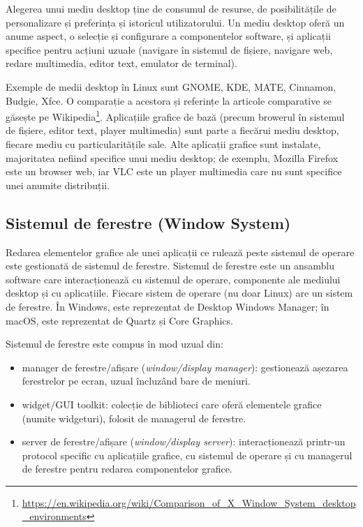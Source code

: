 Alegerea unui mediu desktop ține de consumul de resurse, de posibilitățile de personalizare și preferința și istoricul utilizatorului. Un mediu desktop oferă un anume aspect, o selecție și configurare a componentelor software, și aplicații specifice pentru acțiuni uzuale (navigare în sistemul de fișiere, navigare web, redare multimedia, editor text, emulator de terminal).

Exemple de medii desktop în Linux sunt GNOME, KDE, MATE, Cinnamon, Budgie, Xfce. O comparație a acestora și referințe la articole comparative se găsește pe Wikipedia\footnote{\url{https://en.wikipedia.org/wiki/Comparison\_of\_X\_Window\_System\_desktop\_environments}}. Aplicațiile grafice de bază (precum browerul în sistemul de fișiere, editor text, player multimedia) sunt parte a fiecărui mediu desktop, fiecare mediu cu particularitățile sale. Alte aplicații grafice sunt instalate, majoritatea nefiind specifice unui mediu desktop; de exemplu, Mozilla Firefox este un browser web, iar VLC este un player multimedia care nu sunt specifice unei anumite distribuții.

\subsection{Sistemul de ferestre (Window System)}
\label{sec:ui:window-system}

Redarea elementelor grafice ale unei aplicații ce rulează peste sistemul de operare este gestionată de sistemul de ferestre. Sistemul de ferestre este un ansamblu software care interacționează cu sistemul de operare, componente ale mediului desktop și cu aplicațiile. Fiecare sistem de operare (nu doar Linux) are un sistem de ferestre. În Windows, este reprezentat de Desktop Windows Manager; în macOS, este reprezentat de Quartz și Core Graphics.

Sistemul de ferestre este compus în mod uzual din:

\begin{itemize}
  \item manager de ferestre/afișare (\textit{window/display manager}): gestionează așezarea ferestrelor pe ecran, uzual încluzând bare de meniuri.
  \item widget/GUI toolkit: colecție de biblioteci care oferă elementele grafice (numite widgeturi), folosit de managerul de ferestre.
  \item server de ferestre/afișare (\textit{window/display server}): interacționează printr-un protocol specific cu aplicațiile grafice, cu sistemul de operare și cu managerul de ferestre pentru redarea componentelor grafice.
\end{itemize}

